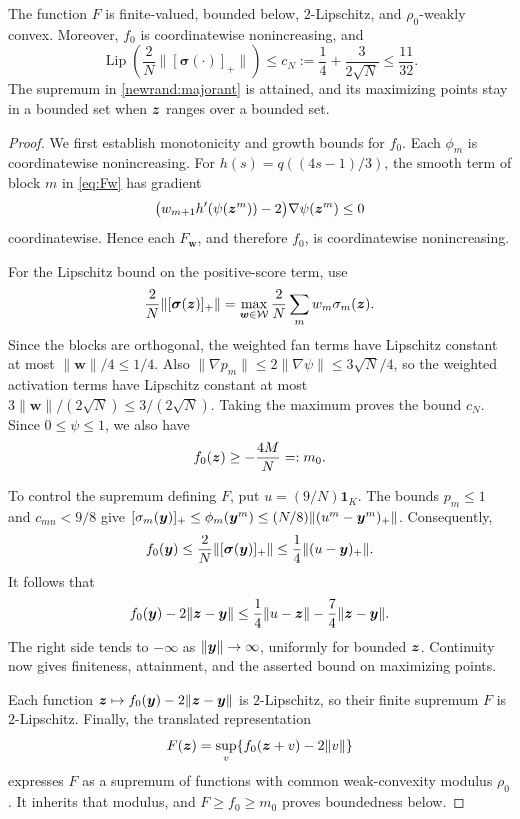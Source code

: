 \begin{proposition}
\label{prop:regularity}
The function $F$ is finite-valued, bounded below, $2$-Lipschitz,
and $\rho_0$-weakly convex. Moreover, $f_0$ is coordinatewise
nonincreasing, and
\[
 \operatorname{Lip}\left(\frac2N\|[\boldsymbol\sigma(\cdot)]_+\|\right)
 \le c_N:=\frac14+\frac3{2\sqrt N}\le\frac{11}{32}.
\]
The supremum in \eqref{newrand:majorant} is attained, and its
maximizing points stay in a bounded set when $\bm{z}$ ranges over
a bounded set.
\end{proposition}
\begin{proof}
We first establish monotonicity and growth bounds for $f_0$.
Each $\phi_m$ is coordinatewise nonincreasing.
For $h(s)=q((4s-1)/3)$, the smooth term of block $m$ in
\eqref{eq:Fw} has gradient
\[
 \bigl(w_{m+1}h'(\psi(\bm{z}^m))-2\bigr)\nabla\psi(\bm{z}^m)\le0
\]
coordinatewise. Hence each $F_{\bm w}$, and therefore $f_0$,
is coordinatewise nonincreasing.

For the Lipschitz bound on the positive-score term, use
\[
 \frac2N\|[\boldsymbol\sigma(\bm{z})]_+\|
 =\max_{\bm w\in\mathcal W}\frac2N\sum_m w_m\sigma_m(\bm{z}).
\]
Since the blocks are orthogonal, the weighted fan terms have
Lipschitz constant at most $\|\bm w\|/4\le1/4$.
Also $\|\nabla p_m\|\le2\|\nabla\psi\|\le3\sqrt N/4$,
so the weighted activation terms have Lipschitz constant at most
$3\|\bm w\|/(2\sqrt N)\le3/(2\sqrt N)$.
Taking the maximum proves the bound $c_N$.
Since $0\le\psi\le1$, we also have
\begin{equation}
 f_0(\bm{z})\ge-\frac{4M}{N}=:m_0.
 \label{eq:lower_f}
\end{equation}

To control the supremum defining $F$, put $u=(9/N)\mathbf1_K$.
The bounds $p_m\le1$ and $c_{mn}<9/8$ give
$[\sigma_m(\bm{y})]_+\le\phi_m(\bm{y}^m)
\le(N/8)\|(u^m-\bm{y}^m)_+\|$. Consequently,
\begin{equation}
 f_0(\bm{y})\le\frac2N\|[\boldsymbol\sigma(\bm{y})]_+\|
 \le\frac14\|(u-\bm{y})_+\|.
 \label{newrand:growth}
\end{equation}
It follows that
\[
 f_0(\bm{y})-2\|\bm{z}-\bm{y}\|
 \le\frac14\|u-\bm{z}\|-\frac74\|\bm{z}-\bm{y}\|.
\]
The right side tends to $-\infty$ as $\|\bm{y}\|\to\infty$,
uniformly for bounded $\bm{z}$. Continuity now gives finiteness,
attainment, and the asserted bound on maximizing points.

Each function $\bm{z}\mapsto f_0(\bm{y})-2\|\bm{z}-\bm{y}\|$ is
$2$-Lipschitz, so their finite supremum $F$ is $2$-Lipschitz.
Finally, the translated representation
\[
 F(\bm{z})=\sup_v\{f_0(\bm{z}+v)-2\|v\|\}
\]
expresses $F$ as a supremum of functions with common
weak-convexity modulus $\rho_0$. It inherits that modulus,
and $F\ge f_0\ge m_0$ proves boundedness below.
\end{proof}


